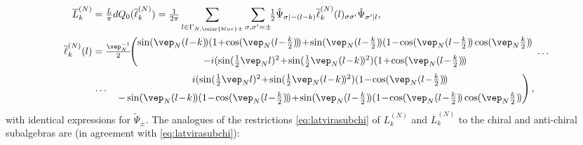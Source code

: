 \documentclass[a4paper, 11pt]{article}
\DeclareMathOperator{\1}{\mathds{1}}
\begin{document}
\begin{align}
\label{eq:latviramajanti}
\overline{L}^{(N)}_{k} & = \tfrac{L}{\pi}dQ_{0}(\overline{\ell}^{(N)}_{k}) = \tfrac{1}{2\pi}\sum_{l\in\Gamma_{N,{\color{blue}\pm}}}\sum_{\sigma,\sigma'=\pm}\!\!\tfrac{1}{2}\hat{\Psi}_{\sigma|-(l-k)}\overline{\ell}^{(N)}_{k}(l)_{\sigma\sigma'}\hat{\Psi}_{\sigma'|l},\\ \nonumber
\overline{\ell}^{(N)}_{k}(l) & = \tfrac{\vep_{N}^{-1}}{2}\!\!\left(\begin{matrix} \sin(\vep_{N}(l\!-\!k)\!)(1\!+\!\cos(\vep_{N}(l\!-\!\tfrac{k}{2})\!)\!)\!+\!\sin(\vep_{N}(l\!-\!\tfrac{k}{2})\!)(1\!-\!\cos(\vep_{N}(l\!-\!\tfrac{k}{2})\!)\cos(\vep_{N}\tfrac{k}{2})\!) &  \\[-0.1cm]  & \!\!\!\dots \\[-0.1cm] -i(\sin(\tfrac{1}{2}\vep_{N}l)^{2}\!+\!\sin(\tfrac{1}{2}\vep_{N}(l\!-\!k)\!)^{2})(1\!+\!\cos(\vep_{N}(l\!-\!\tfrac{k}{2})\!)\!) &  \end{matrix}\right. \\[0.1cm] \nonumber
& \left.\begin{matrix}  & i(\sin(\tfrac{1}{2}\vep_{N}l)^{2}\!+\!\sin(\tfrac{1}{2}\vep_{N}(l\!-\!k)\!)^{2})(1\!-\!\cos(\vep_{N}(l\!-\!\tfrac{k}{2})\!)\!) \\[-0.1cm] \dots &  \\[-0.1cm]  & -\sin(\vep_{N}(l\!-\!k)\!)(1\!-\!\cos(\vep_{N}(l\!-\!\tfrac{k}{2})\!)\!)\!+\!\sin(\vep_{N}(l\!-\!\tfrac{k}{2})\!)(1\!-\!\cos(\vep_{N}(l\!-\!\tfrac{k}{2})\!)\cos(\vep_{N}\tfrac{k}{2})\!)  \end{matrix}\right),
\end{align}
with identical expressions for $\tilde{\Psi}_{\pm}$. The analogues of the restrictions \eqref{eq:latvirasubchi} of $L^{(N)}_{k}$ and $\overline{L}^{(N)}_{k}$ to the chiral and anti-chiral subalgebras are (in agreement with \eqref{eq:latvirasubchi}):
\end{document}
